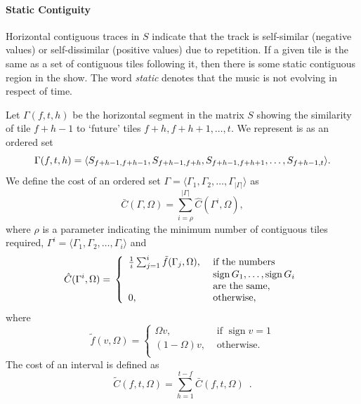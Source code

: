 \documentclass[twocolumn]{article}
\newcommand{\sign}{\mathop{\mathrm{sign}}}
\begin{document}
	\paragraph{Static Contiguity}

	
Horizontal contiguous traces in $S$ indicate that the track is
self-similar (negative values) or self-dissimilar (positive values)
due to repetition. If a given tile is the same as a set of contiguous
tiles following it, then there is some static contiguous region in the
show. The word \textit{static} denotes that the music is not evolving in
respect of time.

Let $\Gamma(f,t,h)$ be the horizontal segment in the matrix $S$
showing the similarity of tile $f+h-1$ to `future' tiles $f+h,
f+h+1,\ldots, t$. We represent is as an ordered set
\begin{dmath*}
\Gamma(f,t,h) =  \langle S_{f+h-1,f+h-1}, S_{f+h-1,f+h}, S_{f+h-1,f+h+1},\ldots,\\
S_{f+h-1,t}\rangle.
\end{dmath*} 
We define the cost of an ordered set $\Gamma=\langle
\Gamma_1,\Gamma_2,\ldots,\Gamma_{|\Gamma|}\rangle$ as
$$
\bar C(\Gamma,\Omega)=\sum_{i=\rho}^{|\Gamma|}\hat C(\Gamma^i,\Omega),
$$ 
where $\rho$ is a parameter indicating the minimum number of
contiguous tiles required, $\Gamma^i=\langle
\Gamma_1,\Gamma_2,\ldots,\Gamma_i\rangle$ and
\begin{dmath*}
\hat C(\Gamma^i,\Omega)=\\ \left\{
\begin{array}{ll}
\frac{1}{i}\sum_{j=1}^i\tilde{f}(\Gamma_j,\Omega),&
 \text{~if the numbers~} \\
& ~\sign{G_1},\ldots,\sign{G_i}\\
& \text{~are the same},\\
0, & \text{~otherwise},
\end{array}
\right.
\end{dmath*}
where
\begin{dmath*}
\tilde{f}(v,\Omega) = \left\{ 
	\begin{array}{lr}
		\Omega v, & \text{~if~} \sign v=1 \\
		(1-\Omega) v, & \mbox{~otherwise.}    \\
	\end{array}
	\right.
\end{dmath*}
The cost of an interval is defined as
\begin{dmath*}
\tilde C(f,t,\Omega) = \sum_{h=1}^{t-f}\bar C(f,t,\Omega)\enspace.
\end{dmath*}
\end{document}
